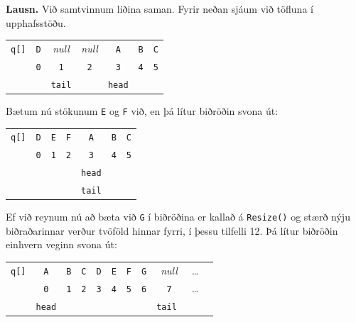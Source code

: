 \documentclass[a4paper, 12pt]{article}
\begin{document}
\noindent
\textbf{Lausn.} Við samtvinnum liðina saman.
Fyrir neðan sjáum við töfluna í upphafsstöðu.
\setlength{\tabcolsep}{15pt}
\renewcommand{\arraystretch}{1.25}
\begin{table}[ht!]
  \centering
  \begin{tabular}{lcccccc}
    \toprule
    \texttt{q[]} &  \texttt D &  \textit{null} &  \textit{null} &  \texttt A &  \texttt B &  \texttt C \\
                 & \texttt 0 & \texttt 1             & \texttt 2             & \texttt 3 & \texttt 4 & \texttt 5 \\
    \bottomrule
                 &  & \texttt{tail} & & \texttt{head} & & \\
  \end{tabular}
\end{table}

\noindent
Bætum nú stökunum \texttt E og \texttt F við, en þá lítur biðröðin svona út:
\begin{table}[ht!]
  \centering
  \begin{tabular}{lcccccc}
    \toprule
    \texttt{q[]} &  \texttt D &  \texttt E &  \texttt F &  \texttt A &  \texttt B &  \texttt C \\
                 & \texttt 0 & \texttt 1             & \texttt 2             & \texttt 3 & \texttt 4 & \texttt 5 \\
    \bottomrule
                 &  &  &  & \texttt{head} & & \\
                 &  &  &  & \texttt{tail} & & \\
  \end{tabular}
\end{table}

\noindent
Ef við reynum nú að bæta við \texttt G í biðröðina er kallað á \texttt{Resize()} og stærð nýju biðraðarinnar verður tvöföld
hinnar fyrri, í þessu tilfelli 12. Þá lítur biðröðin einhvern veginn svona út:

\newpage
\begin{table}[ht!]
  \centering
  \begin{tabular}{lcccccccccc}
    \toprule
    \texttt{q[]} & \texttt A & \texttt B & \texttt C &  \texttt D &  \texttt E &  \texttt F & \texttt G & \textit{null} & \ldots \\
                 & \texttt 0 & \texttt 1 & \texttt 2 &  \texttt 3 &  \texttt 4 &  \texttt 5 & \texttt 6 & \texttt 7 & \ldots \\
    \bottomrule
                 & \texttt{head} &  &  & & & & & \texttt{tail }\\
  \end{tabular}
\end{table}
\end{document}
